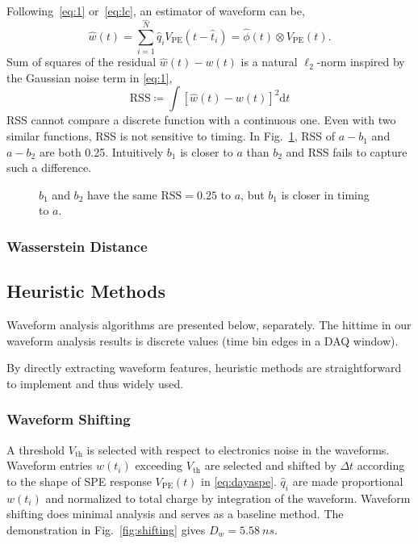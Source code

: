 Following~\eqref{eq:1} or~\eqref{eq:lc}, an estimator of waveform can be,
\begin{equation}
  \label{eq:w-hat}
  \hat{w}(t) = \sum_{i=1}^{\hat{N}}\hat{q}_iV_\mathrm{PE}(t-\hat{t}_i) = \hat{\phi}(t) \otimes V_\mathrm{PE}(t).
\end{equation}
Sum of squares of the residual $\hat{w}(t) - w(t)$ is a natural $\ell_2$-norm inspired by the Gaussian noise term in \eqref{eq:1},
\begin{equation}
  \label{eq:rss}
  \mathrm{RSS}\coloneqq\int\left[\hat{w}(t) - w(t)\right]^2\mathrm{d}t
\end{equation}
RSS cannot compare a discrete function with a continuous one.  Even with two similar functions, RSS is not sensitive to timing.  In Fig.~\ref{fig:l2}, RSS of  $a-b_{1}$ and $a-b_{2}$ are both 0.25.  Intuitively $b_1$ is closer to $a$ than $b_2$ and RSS fails to capture such a difference.
\begin{figure}[H]
    \centering
    \scalebox{0.5}{}
    \caption{\label{fig:l2} $b_1$ and $b_2$ have the same $\mathrm{RSS}=0.25$ to $a$, but $b_1$ is closer in timing to $a$.}
\end{figure}

\subsubsection{Wasserstein Distance}
\label{sec:W-dist}



\subsection{Heuristic Methods}
Waveform analysis algorithms are presented below, separately. The hittime in our waveform analysis results is discrete values (time bin edges in a DAQ window). 

By directly extracting waveform features, heuristic methods are straightforward to implement and thus widely used. 

\subsubsection{Waveform Shifting}
\label{sec:shifting}
A threshold $V_\mathrm{th}$ is selected with respect to electronics noise in the waveforms. Waveform entries $w(t_i)$ exceeding $V_\mathrm{th}$ are selected and shifted by $\Delta t$ according to the shape of SPE response $V_\mathrm{PE}(t)$ in \eqref{eq:dayaspe}. $\hat{q}_i$ are made proportional $w(t_i)$ and normalized to total charge by integration of the waveform.  Waveform shifting does minimal analysis and serves as a baseline method.  The demonstration in Fig.~\ref{fig:shifting} gives $D_w = \SI{5.58}{ns}$.


